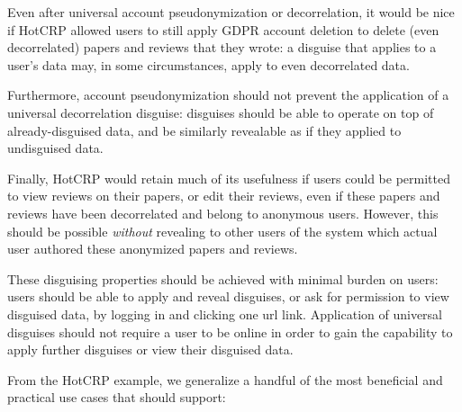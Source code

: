Even after universal account pseudonymization or decorrelation, it would be nice if HotCRP allowed
users to still apply GDPR account deletion to delete (even decorrelated) papers and reviews that they
wrote: a disguise that applies to a user's data may, in some circumstances, apply to even decorrelated data.

Furthermore, account pseudonymization should not prevent the application of a universal
decorrelation disguise: disguises should be able to operate on top of already-disguised data, and be
similarly revealable as if they applied to undisguised data.

Finally, HotCRP would retain much of its usefulness if users could be permitted to view
reviews on their papers, or edit their reviews, even if these papers and reviews have been
decorrelated and belong to anonymous users.
However, this should be possible \emph{without} revealing to other users of the system which
actual user authored these anonymized papers and reviews.

 These disguising properties should be achieved with minimal burden on
users: users should be able to apply and reveal disguises, or ask for permission to view
disguised data, by \eg logging in and clicking one url link. Application of universal disguises
should not require a user to be online in order to gain the capability to apply further disguises or
view their disguised data.

From the HotCRP example, we generalize a handful of the most beneficial and practical use cases
that \sys should support:

